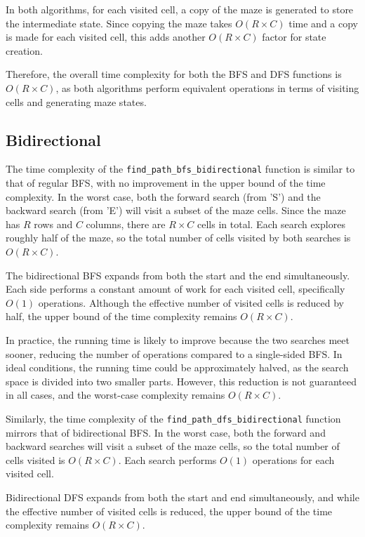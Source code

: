\documentclass[final, journal, 11pt]{report}
\begin{document}
	In both algorithms, for each visited cell, a copy of the maze is generated to store the intermediate state. Since copying the maze takes \( O(R \times C) \) time and a copy is made for each visited cell, this adds another \( O(R \times C) \) factor for state creation.
	
	Therefore, the overall time complexity for both the BFS and DFS functions is \( O(R \times C) \), as both algorithms perform equivalent operations in terms of visiting cells and generating maze states.
	
	\subsection*{Bidirectional}
	The time complexity of the \texttt{find\_path\_bfs\_bidirectional} function is similar to that of regular BFS, with no improvement in the upper bound of the time complexity. In the worst case, both the forward search (from 'S') and the backward search (from 'E') will visit a subset of the maze cells. Since the maze has \( R \) rows and \( C \) columns, there are \( R \times C \) cells in total. Each search explores roughly half of the maze, so the total number of cells visited by both searches is \( O(R \times C) \).
	
	The bidirectional BFS expands from both the start and the end simultaneously. Each side performs a constant amount of work for each visited cell, specifically \( O(1) \) operations. Although the effective number of visited cells is reduced by half, the upper bound of the time complexity remains \( O(R \times C) \).
	
	In practice, the running time is likely to improve because the two searches meet sooner, reducing the number of operations compared to a single-sided BFS. In ideal conditions, the running time could be approximately halved, as the search space is divided into two smaller parts. However, this reduction is not guaranteed in all cases, and the worst-case complexity remains \( O(R \times C) \).
	
	Similarly, the time complexity of the \texttt{find\_path\_dfs\_bidirectional} function mirrors that of bidirectional BFS. In the worst case, both the forward and backward searches will visit a subset of the maze cells, so the total number of cells visited is \( O(R \times C) \). Each search performs \( O(1) \) operations for each visited cell. 
	
	Bidirectional DFS expands from both the start and end simultaneously, and while the effective number of visited cells is reduced, the upper bound of the time complexity remains \( O(R \times C) \).
	
\end{document}
